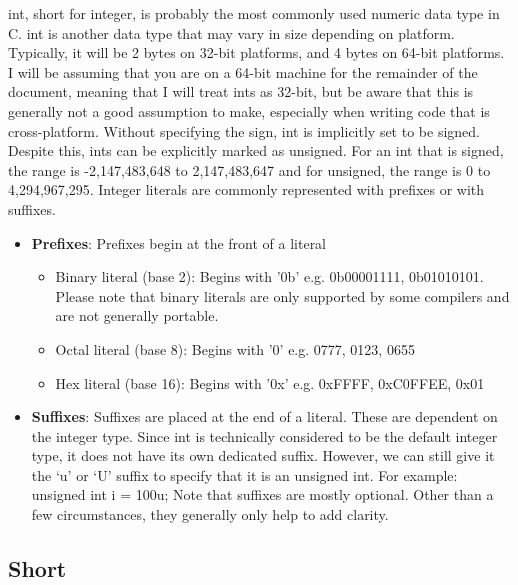 \documentclass{article}
\begin{document}
int, short for integer, is probably the most commonly used numeric data type in C. int is another data type
that may vary in size depending on platform. Typically, it will be 2 bytes on 32-bit platforms, and 4 bytes on
64-bit platforms. I will be assuming that you are on a 64-bit machine for the remainder of the document,
meaning that I will treat ints as 32-bit, but be aware that this is generally not a good assumption to make,
especially when writing code that is cross-platform. Without specifying the sign, int is implicitly set to be
signed. Despite this, ints can be explicitly marked as unsigned. For an int that is signed, the range is
-2,147,483,648 to 2,147,483,647 and for unsigned, the range is 0 to 4,294,967,295. Integer literals are
commonly represented with prefixes or with suffixes.

\begin{itemize}

\item{%
    \textbf{Prefixes}: Prefixes begin at the front of a literal
    \begin{itemize}

        \item{%
            Binary literal (base 2): Begins with '0b' e.g. 0b00001111, 0b01010101. Please note that binary
            literals are only supported by some compilers and are not generally portable.
        }

        \item{Octal literal (base 8): Begins with '0' e.g. 0777, 0123, 0655}

        \item{Hex literal (base 16): Begins with '0x' e.g. 0xFFFF, 0xC0FFEE, 0x01}

    \end{itemize}
}

\item{%
    \textbf{Suffixes}: Suffixes are placed at the end of a literal. These are dependent on the integer type.
    Since int is technically considered to be the default integer type, it does not have its own dedicated
    suffix. However, we can still give it the ‘u’ or ‘U’ suffix to specify that it is an unsigned int. For
    example: unsigned int i = 100u; Note that suffixes are mostly optional. Other than a few circumstances,
    they generally only help to add clarity.
}

\end{itemize}

\subsection{Short}
\end{document}
